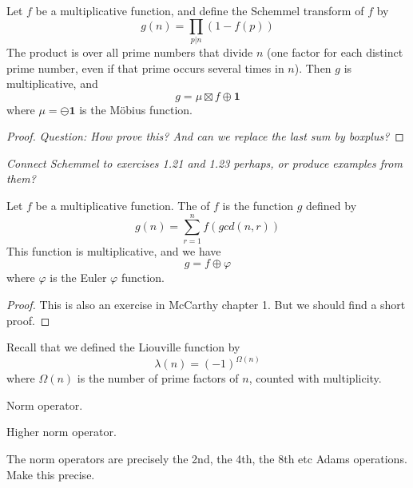 \begin{propdef}
Let $f$ be a multiplicative function, and define the Schemmel transform of $f$ by
$$ g(n) = \prod_{p \vert n} (1-f(p))   $$
The product is over all prime numbers that divide $n$ (one factor for each distinct prime number, even if that prime occurs several times in $n$). Then $g$ is multiplicative, and 
$$  g = \mu \boxtimes f \oplus \mathbf{1}    $$
where $\mu = \ominus \mathbf{1}$ is the M{\"o}bius function.
\end{propdef}
\begin{proof}
\emph{Question: How prove this? And can we replace the last sum by boxplus?}
\end{proof}

\emph{Connect Schemmel to exercises 1.21 and 1.23 perhaps, or produce examples from them?}

\begin{propdef}
Let $f$ be a multiplicative function. The  of $f$ is the function $g$ defined by
$$ g(n) = \sum_{r=1}^n f(gcd(n, r))   $$
This function is multiplicative, and we have
$$ g = f \oplus \varphi    $$
where $\varphi$ is the Euler $\varphi$ function.
\end{propdef}
\begin{proof}
This is also an exercise in McCarthy chapter 1. But we should find a short proof.
\end{proof}


Recall that we defined the Liouville function by
$$  \lambda(n) = (-1)^{\Omega(n)} $$
where $\Omega(n)$ is the number of prime factors of $n$, counted with multiplicity. 
\begin{propdef}
Norm operator.
\end{propdef}


\begin{propdef}
Higher norm operator. 
\end{propdef}


\begin{theorem}
The norm operators are precisely the 2nd, the 4th, the 8th etc Adams operations. Make this precise.
\end{theorem}


